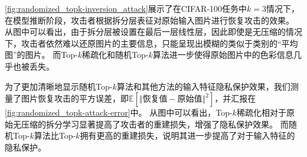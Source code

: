 \autoref{fig:randomized_topk-inversion_attack}展示了在CIFAR-100任务中$k=3$情况下，在模型推断阶段，攻击者根据拆分层表征对原始输入图片进行恢复攻击的效果。
从图中可以看出，由于拆分层被设置在最后一层线性层，因此即使是无压缩的情况下，攻击者依然难以还原图片的主要信息，只能呈现出模糊的类似于类别的“平均图”的图片。
%
而Top-$k$稀疏化和随机Top-$k$算法进一步使得原始图片中的色彩信息几乎也被丢失。
%

为了更加清晰地显示随机Top-$k$算法和其他方法的输入特征隐私保护效果，我们测量了图片恢复攻击的平方误差，即$\mathbb E\left[ \Vert \text{恢复值} - \text{原始值} \Vert^2 \right]$，并汇报在\autoref{fig:randomized_topk-attack-error}中。
%
从图中可以看出，Top-$k$稀疏化相对于原始无压缩的拆分学习显著提高了攻击者的重建损失，增强了隐私保护效果。
而随机Top-$k$算法比Top-$k$拥有更高的重建损失，说明其进一步提高了对于输入特征的隐私保护。


